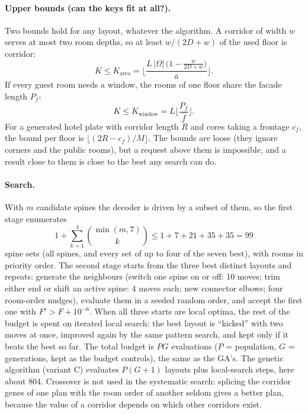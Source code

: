 \paragraph{Upper bounds (can the keys fit at all?).} Two bounds hold for any layout, whatever the algorithm.
A corridor of width $w$ serves at most two room depths, so at least $w/(2D+w)$ of the used floor is corridor:
\[ K \le K_{\text{area}} = \Big\lfloor \frac{L\,|\Omega|\,\big(1 - \tfrac{w}{2D+w}\big)}{\bar a} \Big\rfloor . \]
If every guest room needs a window, the rooms of one floor share the facade length $P_f$:
\[ K \le K_{\text{window}} = L \Big\lfloor \frac{P_f}{\bar f} \Big\rfloor . \]
For a generated hotel plate with corridor length $R$ and cores taking a frontage $c_f$, the bound per floor is
$\lfloor (2R - c_f)/M \rfloor$. The bounds are loose (they ignore corners and the public rooms), but a request above them
is impossible, and a result close to them is close to the best any search can do.

\paragraph{Search.} With $m$ candidate spines the decoder is driven by a subset of them, so the first stage enumerates
\[ 1 + \sum_{k=1}^{4} \binom{\min(m,7)}{k} \le 1 + 7 + 21 + 35 + 35 = 99 \]
spine sets (all spines, and every set of up to four of the seven best), with rooms in priority order. The second stage
starts from the three best distinct layouts and repeats: generate the neighbours (switch one spine on or off: 10 moves; trim
either end or shift an active spine: 4 moves each; new connector elbows; four room-order nudges), evaluate them in a seeded
random order, and accept the first one with $F' > F + 10^{-6}$. When all three starts are local optima, the rest of the budget is spent on iterated local search: the best
layout is ``kicked'' with two moves at once, improved again by the same pattern search, and kept only if it beats
the best so far. The total budget is $PG$ evaluations ($P$ = population, $G$ = generations, kept as the budget
controls), the same as the GA's. The genetic algorithm (variant C)
evaluates $P(G+1)$ layouts plus local-search steps, here about 804. Crossover is not used in the systematic search:
splicing the corridor genes of one plan with the room order of another seldom gives a better plan, because the value of a
corridor depends on which other corridors exist.

